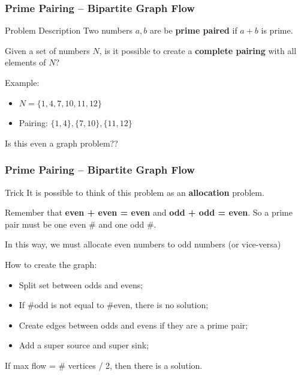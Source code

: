 \begin{frame}
  \frametitle{Prime Pairing -- Bipartite Graph Flow}
  \begin{block}{Problem Description}
    Two numbers $a,b$ are be {\bf prime paired} if $a+b$ is prime.\bigskip

    Given a set of numbers $N$, is it possible to create a {\bf complete pairing} with all elements of $N$?
  \end{block}\bigskip

  Example:
  \begin{itemize}
  \item $N = \{1,4,7,10,11,12\}$
  \item Pairing: $\{1,4\}, \{7,10\}, \{11,12\}$
  \end{itemize}

  \vfill

  Is this even a graph problem??
\end{frame}

\begin{frame}
  \frametitle{Prime Pairing -- Bipartite Graph Flow}
  \begin{block}{Trick}
    It is possible to think of this problem as an {\bf allocation} problem.\bigskip

    Remember that {\bf even + even = even} and {\bf odd + odd = even}. So a prime pair must be one even \# and one odd \#.\bigskip

    In this way, we must allocate even numbers to odd numbers (or vice-versa)
  \end{block}

  How to create the graph:
  \begin{itemize}
  \item Split set between odds and evens;
  \item If \#odd is not equal to \#even, there is no solution;
  \item Create edges between odds and evens if they are a prime pair;
  \item Add a super source and super sink;
  \end{itemize}\bigskip

  If max flow = \# vertices / 2, then there is a solution.
\end{frame}

